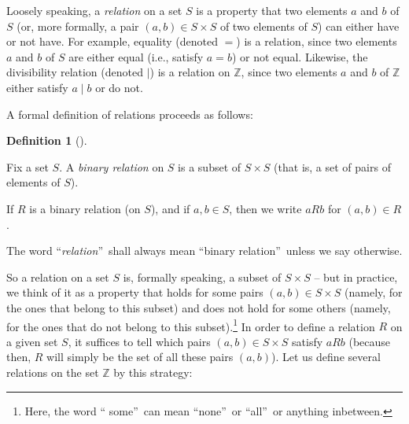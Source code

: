 \documentclass[numbers=enddot,12pt,final,onecolumn,notitlepage]{scrartcl}%
\numberwithin{exer}{subsection}
\theoremstyle{definition}
\newtheorem{defi}[theo]{Definition}
\newenvironment{definition}[1][]
{\begin{defi}[#1]\begin{leftbar}}
{\end{leftbar}\end{defi}}
\begin{document}
Loosely speaking, a \textit{relation} on a set $S$ is a property that two
elements $a$ and $b$ of $S$ (or, more formally, a pair $\left(  a,b\right)
\in S\times S$ of two elements of $S$) can either have or not have. For
example, equality (denoted $=$) is a relation, since two elements $a$ and $b$
of $S$ are either equal (i.e., satisfy $a=b$) or not equal. Likewise, the
divisibility relation (denoted $\mid$) is a relation on $\mathbb{Z}$, since
two elements $a$ and $b$ of $\mathbb{Z}$ either satisfy $a\mid b$ or do not.

A formal definition of relations proceeds as follows:

\begin{definition}
\label{def.eqrel.rel.rel}Fix a set $S$. A \textit{binary relation} on $S$ is a
subset of $S\times S$ (that is, a set of pairs of elements of $S$).

If $R$ is a binary relation (on $S$), and if $a,b\in S$, then we write $aRb$
for $\left(  a,b\right)  \in R$.

The word \textquotedblleft\textit{relation}\textquotedblright\ shall always
mean \textquotedblleft binary relation\textquotedblright\ unless we say otherwise.
\end{definition}

So a relation on a set $S$ is, formally speaking, a subset of $S\times S$ --
but in practice, we think of it as a property that holds for some pairs
$\left(  a,b\right)  \in S\times S$ (namely, for the ones that belong to this
subset) and does not hold for some others (namely, for the ones that do not
belong to this subset).\footnote{Here, the word \textquotedblleft
some\textquotedblright\ can mean \textquotedblleft none\textquotedblright\ or
\textquotedblleft all\textquotedblright\ or anything inbetween.} In order to
define a relation $R$ on a given set $S$, it suffices to tell which pairs
$\left(  a,b\right)  \in S\times S$ satisfy $aRb$ (because then, $R$ will
simply be the set of all these pairs $\left(  a,b\right)  $). Let us define
several relations on the set $\mathbb{Z}$ by this strategy:
\end{document}
